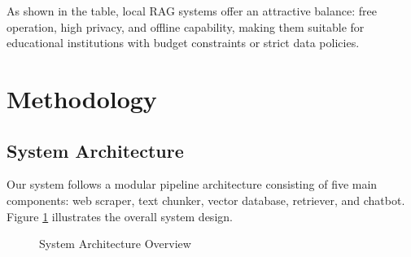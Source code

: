 \documentclass[conference]{IEEEtran}
\begin{document}
\begin{table}[h]
\centering
\small
{}
\end{table}

As shown in the table, local RAG systems offer an attractive balance: free operation, high privacy, and offline capability, making them suitable for educational institutions with budget constraints or strict data policies.

\section{Methodology}
\label{sec:methodology}

\subsection{System Architecture}
Our system follows a modular pipeline architecture consisting of five main components: web scraper, text chunker, vector database, retriever, and chatbot. Figure \ref{fig:architecture} illustrates the overall system design.

\begin{figure}[h]
\centering
{}
\caption{System Architecture Overview}
\label{fig:architecture}
\end{figure}
\end{document}
